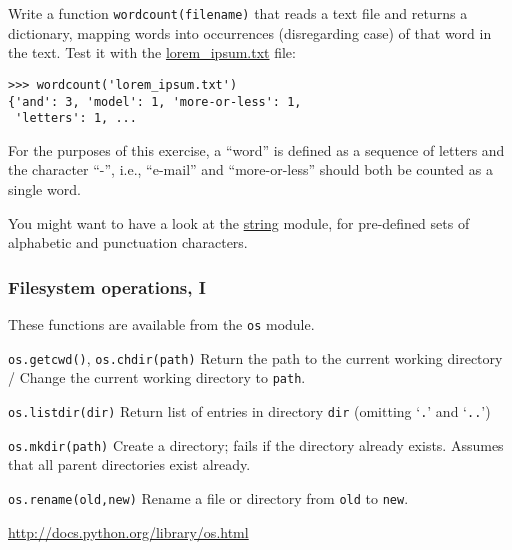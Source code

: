 \documentclass[english,serif,mathserif,xcolor=pdftex,dvipsnames,table]{beamer}
\begin{document}
\begin{frame}[fragile]
\begin{exercise}
    Write a function \lstinline|wordcount(filename)| that reads a text
    file and returns a dictionary, mapping words into occurrences
    (disregarding case) of that word in the text.  Test it with the
    \href{https://raw.github.com/gc3-uzh-ch/python-course/master/lorem_ipsum.txt}{lorem\_ipsum.txt} file:
    \begin{lstlisting}
>>> wordcount('lorem_ipsum.txt')
{'and': 3, 'model': 1, 'more-or-less': 1, 
 'letters': 1, ...
    \end{lstlisting}

    \+ For the purposes of this
    exercise, a ``word'' is defined as a sequence of letters and the
    character ``-'', i.e., ``e-mail'' and ``more-or-less'' should both
    be counted as a single word.

    \+ You might want to have a look at the
    \href{http://docs.python.org/2/library/string.html}{string}
    module, for pre-defined sets of alphabetic and punctuation
    characters.
  \end{exercise}
\end{frame}


\begin{frame}[fragile]
  \frametitle{Filesystem operations, I}
  \small
  These functions are available from the \texttt{os} module.

  \begin{describe}{\lstinline|os.getcwd()|, \lstinline|os.chdir(path)|}
    Return the path to the current working directory /
    Change the current working directory to \texttt{path}.
  \end{describe}

  \begin{describe}{\lstinline|os.listdir(dir)|}
    Return list of entries in directory \texttt{dir} (omitting
    `\texttt{.}' and `\texttt{..}')
  \end{describe}

  \begin{describe}{\lstinline|os.mkdir(path)|}
    Create a directory; fails if the directory already exists.
    Assumes that all parent directories exist already.
  \end{describe}


  \begin{describe}{\lstinline|os.rename(old,new)|}
    Rename a file or directory from \texttt{old} to \texttt{new}.
  \end{describe}

  \begin{references}
    \url{http://docs.python.org/library/os.html}
  \end{references}
\end{frame}
\end{document}
